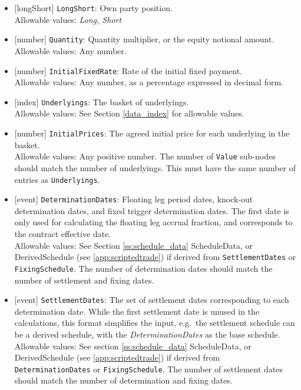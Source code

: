 \begin{itemize}
  \item{}[longShort] \lstinline!LongShort!: Own party position. \\
  Allowable values: \emph{Long, Short}
  \item{}[number] \lstinline!Quantity!: Quantity multiplier, or the equity notional amount. \\
  Allowable values: Any number.
  \item{}[number] \lstinline!InitialFixedRate!: Rate of the initial fixed payment. \\
  Allowable values: Any number, as a percentage expressed in decimal form.
  \item{}[index] \lstinline!Underlyings!: The basket of underlyings. \\
  Allowable values: See Section \ref{data_index} for allowable values.
  \item{}[number] \lstinline!InitialPrices!: The agreed initial price for each underlying in the basket. \\
  Allowable values: Any positive number. The number of \lstinline!Value! sub-nodes should match the number of underlyings.
  This must have the same number of entries as \lstinline!Underlyings!.
  \item{}[event] \lstinline!DeterminationDates!: Floating leg period dates, knock-out determination dates, and fixed trigger
  determination dates. The first date is only used for calculating the floating leg accrual fraction, and corresponds
  to the contract effective date. \\
  Allowable values: See Section \ref{ss:schedule_data} ScheduleData, or DerivedSchedule (see \ref{app:scriptedtrade}) if
  derived from \lstinline!SettlementDates! or \lstinline!FixingSchedule!. The number of determination dates should
  match the number of settlement and fixing dates.
  \item{}[event] \lstinline!SettlementDates!: The set of settlement dates corresponding to each determination date. While the first
  settlement date is unused in the calculations, this format simplifies the input, e.g.\ the settlement schedule can be
  a derived schedule, with the \emph{DeterminationDates} as the base schedule. \\
  Allowable values: See section \ref{ss:schedule_data} ScheduleData, or DerivedSchedule (see \ref{app:scriptedtrade}) if
  derived from \lstinline!DeterminationDates! or \lstinline!FixingSchedule!. The number of settlement dates should
  match the number of determination and fixing dates.

\end{itemize}
